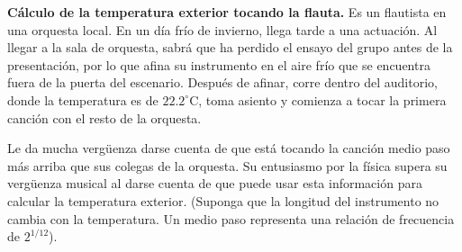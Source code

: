 \item \textbf{Cálculo de la temperatura exterior tocando la flauta.}
Es un flautista en una orquesta local. En un día frío de invierno, llega tarde a una actuación. Al llegar a la sala de orquesta, sabrá que ha perdido el ensayo del grupo antes de la presentación, por lo que afina su instrumento en el aire frío que se encuentra fuera de la puerta del escenario. Después de afinar, corre dentro del auditorio, donde la temperatura es de $22.2^\circ\text{C}$, toma asiento y comienza a tocar la primera canción con el resto de la orquesta.

Le da mucha vergüenza darse cuenta de que está tocando la canción medio paso más arriba que sus colegas de la orquesta. Su entusiasmo por la física supera su vergüenza musical al darse cuenta de que puede usar esta información para calcular la temperatura exterior. (Suponga que la longitud del instrumento no cambia con la temperatura. Un medio paso representa una relación de frecuencia de $2^{1/12}$).